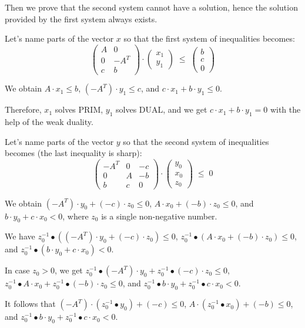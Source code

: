 \documentclass[]{article}
\begin{document}
Then we prove that the second system cannot have a solution,
hence the solution provided by the first system always exists.

Let's name parts of the vector $x$ so that the first system of inequalities becomes:
$$
\begin{pmatrix}
	A & 0 \\
	0 & -A^T \\
	c & b
\end{pmatrix}
\cdot
\begin{pmatrix}
	x_1 \\
	y_1
\end{pmatrix}
\;\le\;
\begin{pmatrix}
	b \\
	c \\
	0
\end{pmatrix}
$$

We obtain $A \cdot x_1 \le b$, $(-A^T) \cdot y_1 \le c$, and
$c \cdot x_1 + b \cdot y_1 \le 0$.

Therefore, $x_1$ solves PRIM, $y_1$ solves DUAL, and we get
$c \cdot x_1 + b \cdot y_1 = 0$ with the help of the weak duality.
\bigskip

Let's name parts of the vector $y$ so that the second system of inequalities becomes
(the last inequality is sharp):
$$
\begin{pmatrix}
	-A^T & 0 & -c \\
	0 & A & -b \\
	b & c & 0
\end{pmatrix}
\cdot
\begin{pmatrix}
	y_0 \\
	x_0 \\
	z_0
\end{pmatrix}
\;\le\;
0
$$

We obtain
$(-A^T) \cdot y_0 + (-c) \cdot z_0 \le 0$,
$A \cdot x_0 + (-b) \cdot z_0 \le 0$, and
$b \cdot y_0 + c \cdot x_0 < 0$, where
$z_0$ is a single non-negative number.

We have $z_0^{-1} \bullet ((-A^T) \cdot y_0 + (-c) \cdot z_0) \le 0$,
$z_0^{-1} \bullet (A \cdot x_0 + (-b) \cdot z_0) \le 0$, and
$z_0^{-1} \bullet (b \cdot y_0 + c \cdot x_0) < 0$.

In case $z_0 > 0$, we get
$z_0^{-1} \bullet (-A^T) \cdot y_0 + z_0^{-1} \bullet (-c) \cdot z_0 \le 0$,
$z_0^{-1} \bullet A \cdot x_0 + z_0^{-1} \bullet (-b) \cdot z_0 \le 0$, and
$z_0^{-1} \bullet b \cdot y_0 + z_0^{-1} \bullet c \cdot x_0 < 0$.

It follows that
$(-A^T) \cdot (z_0^{-1} \bullet y_0) + (-c) \le 0$,
$A \cdot (z_0^{-1} \bullet x_0) + (-b) \le 0$, and
$z_0^{-1} \bullet b \cdot y_0 + z_0^{-1} \bullet c \cdot x_0 < 0$.
\end{document}
